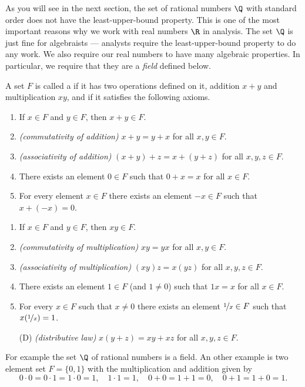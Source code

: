 \documentclass[12pt]{book}
\begin{document}
As you will see in the next section, the set of rational numbers $\Q$ with standard order does not have the least-upper-bound property.
This is one of the most important reasons why we work with real numbers $\R$ in analysis.
The set $\Q$ is just fine for algebraists --- analysts require the least-upper-bound
property to do any work.
We also require our real numbers to have many algebraic properties.  
In particular, we require that they are a \emph{field} defined below.

\begin{defn}
A set $F$ is called a \emph{} if it has two operations
defined on it, addition $x+y$ and multiplication $xy$, and if it satisfies
the following axioms.
\begin{enumerate}[({A}1)]
\item If $x \in F$ and $y \in F$, then $x+y \in F$.
\item \emph{(commutativity of addition)}
$x+y = y+x$ for all $x,y \in F$.
\item \emph{(associativity of addition)}
$(x+y)+z = x+(y+z)$ for all $x,y,z \in F$.
\item There exists an element $0 \in F$ such that
$0+x = x$ for all $x \in F$.
\item For every element $x\in F$ there exists an element $-x \in F$
such that $x + (-x) = 0$.
\end{enumerate}
\begin{enumerate}[({M}1)]
\item If $x \in F$ and $y \in F$, then $xy \in F$.
\item \emph{(commutativity of multiplication)}
$xy = yx$ for all $x,y \in F$.
\item \emph{(associativity of multiplication)}
$(xy)z = x(yz)$ for all $x,y,z \in F$.
\item There exists an element $1 \in F$ (and $1 \not= 0$) such that
$1x = x$ for all $x \in F$.
\item For every $x\in F$ such that $x \not= 0$ there exists an element
$\nicefrac{1}{x} \in F$
such that $x(\nicefrac{1}{x}) = 1$.
\item[(D)] \emph{(distributive law)} $x(y+z) = xy+xz$
for all $x,y,z \in F$.
\end{enumerate}
\end{defn}


For example the set $\Q$ of rational numbers is a field.
An other example is two element set $F=\{0,1\}$ with the multiplication and addition given by
$$0\cdot 0=0\cdot 1=1\cdot 0=1,\quad 1\cdot 1=1,\quad 0+0=1+1=0,\quad 0+1=1+0=1.$$
\end{document}
